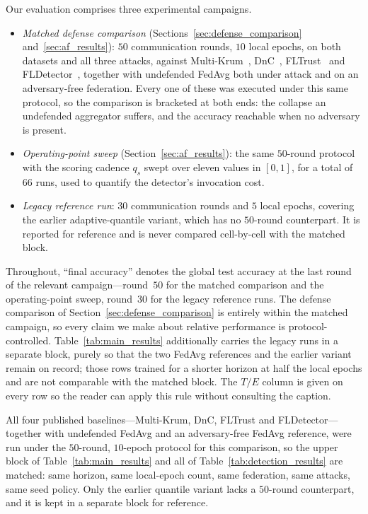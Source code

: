 \documentclass[journal]{IEEEtran}
\begin{document}
Our evaluation comprises three experimental campaigns.
\begin{itemize}
    \item \emph{Matched defense comparison} (Sections~\ref{sec:defense_comparison} and~\ref{sec:af_results}): $50$ communication rounds, $10$ local epochs, on both datasets and all three attacks, against Multi-Krum~\cite{blanchard2017machine}, DnC~\cite{shejwalkar2021manipulating}, FLTrust~\cite{cao2020fltrust} and FLDetector~\cite{zhang2022fldetector}, together with undefended FedAvg both under attack and on an adversary-free federation. Every one of these was executed under this same protocol, so the comparison is bracketed at both ends: the collapse an undefended aggregator suffers, and the accuracy reachable when no adversary is present.
    \item \emph{Operating-point sweep} (Section~\ref{sec:af_results}): the same $50$-round protocol with the scoring cadence $q_s$ swept over eleven values in $[0,1]$, for a total of $66$ runs, used to quantify the detector's invocation cost.
    \item \emph{Legacy reference run}: $30$ communication rounds and $5$ local epochs, covering the earlier adaptive-quantile variant, which has no $50$-round counterpart. It is reported for reference and is never compared cell-by-cell with the matched block.
\end{itemize}

Throughout, ``final accuracy'' denotes the global test accuracy at the last round of the relevant campaign---round~$50$ for the matched comparison and the operating-point sweep, round~$30$ for the legacy reference runs. The defense comparison of Section~\ref{sec:defense_comparison} is entirely within the matched campaign, so every claim we make about relative performance is protocol-controlled. Table~\ref{tab:main_results} additionally carries the legacy runs in a separate block, purely so that the two FedAvg references and the earlier variant remain on record; those rows trained for a shorter horizon at half the local epochs and are not comparable with the matched block. The $T/E$ column is given on every row so the reader can apply this rule without consulting the caption.

All four published baselines---Multi-Krum, DnC, FLTrust and FLDetector---together with undefended FedAvg and an adversary-free FedAvg reference, were run under the $50$-round, $10$-epoch protocol for this comparison, so the upper block of Table~\ref{tab:main_results} and all of Table~\ref{tab:detection_results} are matched: same horizon, same local-epoch count, same federation, same attacks, same seed policy. Only the earlier quantile variant lacks a $50$-round counterpart, and it is kept in a separate block for reference.
\end{document}
